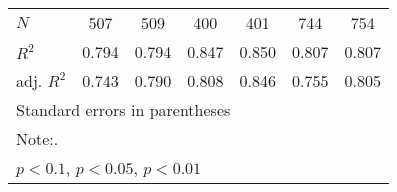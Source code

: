 \begin{table}[htbp]
\begin{tabular}{l*{6}{c}}
\hline
\(N\)     &      507         &      509         &      400         &      401         &      744         &      754         \\
\(R^{2}\) &    0.794         &    0.794         &    0.847         &    0.850         &    0.807         &    0.807         \\
adj. \(R^{2}\)&    0.743         &    0.790         &    0.808         &    0.846         &    0.755         &    0.805         \\
\hline\hline
\multicolumn{7}{l}{\footnotesize Standard errors in parentheses}\\
\multicolumn{7}{l}{\footnotesize Note:.}\\
\multicolumn{7}{l}{\footnotesize \sym{*} \(p<0.1\), \sym{**} \(p<0.05\), \sym{***} \(p<0.01\)}\\
\end{tabular}
\end{table}
